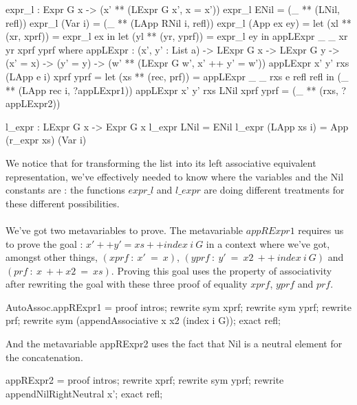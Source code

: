 \documentclass{sigplanconf}
\begin{document}
\begin{code}[caption=Production of the left associative form, captionpos=b, label=lst1:haskell2]
  expr_l : Expr G x -> 
               (x' ** (LExpr G x', x = x'))
  expr_l ENil = (_ ** (LNil, refl))
  expr_l (Var i) = (_ ** 
                   (LApp RNil i, refl))
  expr_l (App ex ey) = 
  	let (xl ** (xr, xprf)) = expr_l ex in
  	let (yl ** (yr, yprf)) = expr_l ey in
   	   appLExpr _ _ xr yr xprf yprf
    where 
       appLExpr : (x', y' : List a) ->
         LExpr G x -> LExpr G y -> 
         (x' = x) -> (y' = y) ->
         (w' ** (LExpr G w', x' ++ y' = w'))
       appLExpr x' y' rxs (LApp e i) xprf yprf =
          let (xs ** (rec, prf)) = 
             appLExpr _ _ rxs e refl refl in
             (_ ** (LApp rec i, ?appLExpr1))
       appLExpr x' y' rxs LNil xprf yprf = 
          (_ ** (rxs, ?appLExpr2))


  l_expr : LExpr G x -> Expr G x
  l_expr LNil = ENil
  l_expr (LApp xs i) = App (r_expr xs) (Var i)
\end{code}

We notice that for transforming the list into its left associative equivalent representation, we've effectively needed to know where the variables and the Nil constants are : the functions $expr\_l$ and $l\_expr$ are doing different treatments for these different possibilities. \\
\\
We've got two metavariables to prove. The metavariable $appRExpr1$ requires us to prove the goal : $x' ++ y' = xs ++ index\ i\ G$ in a context where we've got, amongst other things,  $(xprf\ :\ x'\ =\ x)$, $(yprf\ :\ y'\ =\ x2\ ++\ index\ i\ G)$ and $(prf\ :\ x\ ++\ x2\ =\ xs)$.
Proving this goal uses the property of associativity after rewriting the goal with these three proof of equality $xprf$, $yprf$ and $prf$.

\begin{code}[caption=Proof of the metavariable appRExpr1, captionpos=b, label=lst1:haskell2]
AutoAssoc.appRExpr1 = proof {
  intros;
  rewrite sym xprf;
  rewrite sym yprf;
  rewrite prf;
  rewrite sym 
       (appendAssociative x x2 (index i G));
  exact refl;
}
\end{code}

And the metavariable appRExpr2 uses the fact that Nil is a neutral element for the concatenation.

\begin{code}[caption=Proof of the metavariable appRExpr2, captionpos=b, label=lst1:haskell2]
appRExpr2 = proof {
  intros;
  rewrite xprf;
  rewrite sym yprf;
  rewrite appendNilRightNeutral x';
  exact refl;
}
\end{code}
\end{document}
